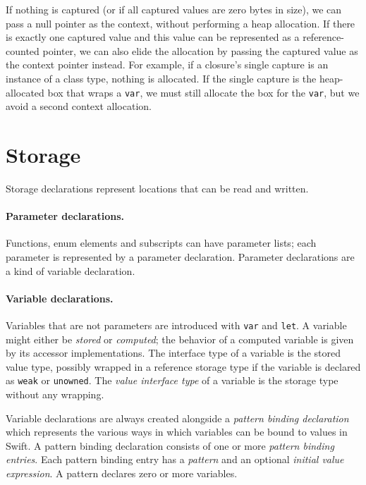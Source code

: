 \documentclass[../generics]{subfiles}
\begin{document}
If nothing is captured (or if all captured values are zero bytes in size), we can pass a null pointer as the context, without performing a heap allocation. If there is exactly one captured value and this value can be represented as a reference-counted pointer, we can also elide the allocation by passing the captured value as the context pointer instead. For example, if a closure's single capture is an instance of a class type, nothing is allocated. If the single capture is the heap-allocated box that wraps a \texttt{var}, we must still allocate the box for the \texttt{var}, but we avoid a second context allocation.

\section{Storage}\label{other decls}

Storage declarations represent locations that can be read and written.

\paragraph{Parameter declarations.} Functions, enum elements and subscripts can have parameter lists; each parameter is represented by a parameter declaration. Parameter declarations are a kind of variable declaration.

\paragraph{Variable declarations.} Variables that are not parameters are introduced with \texttt{var} and \texttt{let}. A variable might either be \emph{stored} or \emph{computed}; the behavior of a computed variable is given by its accessor implementations. The interface type of a variable is the stored value type, possibly wrapped in a reference storage type if the variable is declared as \texttt{weak} or \texttt{unowned}. The \emph{value interface type} of a variable is the storage type without any wrapping.

Variable declarations are always created alongside a \emph{pattern binding declaration} which represents the various ways in which variables can be bound to values in Swift. A pattern binding declaration consists of one or more \emph{pattern binding entries}. Each pattern binding entry has a \emph{pattern} and an optional \emph{initial value expression}. A pattern declares zero or more variables.
\end{document}
